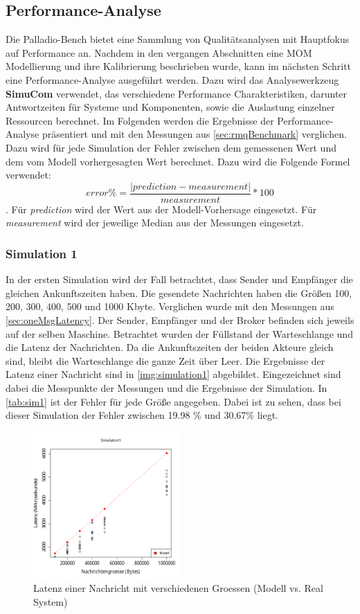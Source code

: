 \subsection{Performance-Analyse}
Die Palladio-Bench bietet eine Sammlung von Qualitätsanalysen mit Hauptfokus auf Performance an. Nachdem in den vergangen Abschnitten eine MOM Modellierung und ihre Kalibrierung beschrieben wurde, kann im nächsten Schritt eine Performance-Analyse ausgeführt werden. Dazu wird das Analysewerkzeug \textbf{SimuCom} verwendet, das verschiedene Performance Charakteristiken, darunter Antwortzeiten für Systeme und Komponenten, sowie die Auslastung einzelner Ressourcen berechnet. Im Folgenden werden die Ergebnisse der Performance-Analyse präsentiert und mit den Messungen aus \autoref{sec:rmqBenchmark} verglichen. Dazu wird für jede Simulation der Fehler zwischen dem gemessenen Wert und dem vom Modell vorhergesagten Wert berechnet. Dazu wird die Folgende Formel verwendet: \[ error\% = \frac{|prediction - measurement|}{measurement} * 100 \]. Für \textit{prediction} wird der Wert aus der Modell-Vorhersage eingesetzt. Für \textit{measurement} wird der jeweilige Median aus der Messungen eingesetzt.
\subsubsection{Simulation 1} 
\label{sec:rmqSimulation1}
In der ersten Simulation wird der Fall betrachtet, dass Sender und Empfänger die gleichen Ankunftszeiten haben. Die gesendete Nachrichten haben die Größen 100, 200, 300, 400, 500 und 1000 Kbyte. Verglichen wurde mit den Messungen aus \autoref{sec:oneMsgLatency}. Der Sender, Empfänger und der Broker befinden sich jeweils auf der selben Maschine. Betrachtet wurden der Füllstand der Warteschlange und die Latenz der Nachrichten. 
Da die Ankunftszeiten der beiden Akteure gleich sind, bleibt die Warteschlange die ganze Zeit über Leer. Die Ergebnisse der Latenz einer Nachricht sind in \autoref{img:simulation1} abgebildet. Eingezeichnet sind dabei die Messpunkte der Messungen und die Ergebnisse der Simulation. In \autoref{tab:sim1} ist der Fehler für jede Größe angegeben. Dabei ist zu sehen, dass bei dieser Simulation der Fehler zwischen 19.98 \% und 30.67\% liegt.

\begin{figure}
\center
  \includegraphics[width=0.5\textwidth]{images/modelSimulationResults/simulation1.pdf}
  \caption{Latenz einer Nachricht mit verschiedenen Groessen (Modell vs. Real System)}
  \label{img:simulation1}
\end{figure}

